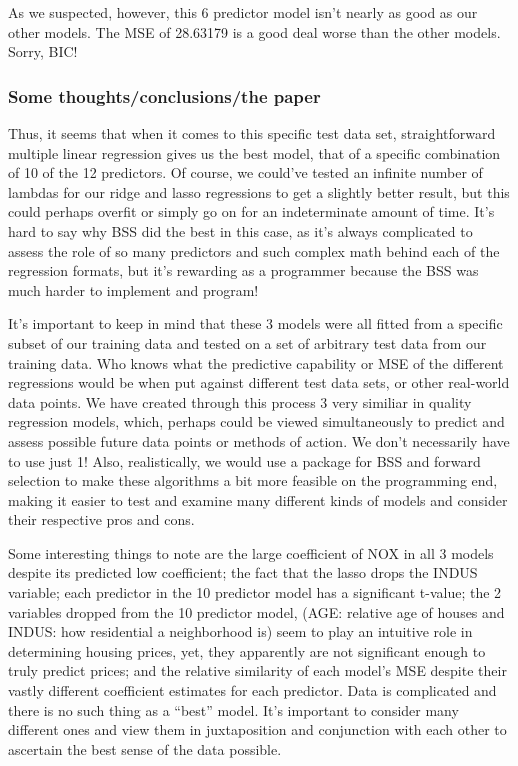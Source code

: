 \documentclass[]{article}
\begin{document}
As we suspected, however, this 6 predictor model isn't nearly as good as
our other models. The MSE of 28.63179 is a good deal worse than the
other models. Sorry, BIC!

\subsubsection{Some thoughts/conclusions/the
paper}\label{some-thoughtsconclusionsthe-paper}

Thus, it seems that when it comes to this specific test data set,
straightforward multiple linear regression gives us the best model, that
of a specific combination of 10 of the 12 predictors. Of course, we
could've tested an infinite number of lambdas for our ridge and lasso
regressions to get a slightly better result, but this could perhaps
overfit or simply go on for an indeterminate amount of time. It's hard
to say why BSS did the best in this case, as it's always complicated to
assess the role of so many predictors and such complex math behind each
of the regression formats, but it's rewarding as a programmer because
the BSS was much harder to implement and program!

It's important to keep in mind that these 3 models were all fitted from
a specific subset of our training data and tested on a set of arbitrary
test data from our training data. Who knows what the predictive
capability or MSE of the different regressions would be when put against
different test data sets, or other real-world data points. We have
created through this process 3 very similiar in quality regression
models, which, perhaps could be viewed simultaneously to predict and
assess possible future data points or methods of action. We don't
necessarily have to use just 1! Also, realistically, we would use a
package for BSS and forward selection to make these algorithms a bit
more feasible on the programming end, making it easier to test and
examine many different kinds of models and consider their respective
pros and cons.

Some interesting things to note are the large coefficient of NOX in all
3 models despite its predicted low coefficient; the fact that the lasso
drops the INDUS variable; each predictor in the 10 predictor model has a
significant t-value; the 2 variables dropped from the 10 predictor
model, (AGE: relative age of houses and INDUS: how residential a
neighborhood is) seem to play an intuitive role in determining housing
prices, yet, they apparently are not significant enough to truly predict
prices; and the relative similarity of each model's MSE despite their
vastly different coefficient estimates for each predictor. Data is
complicated and there is no such thing as a ``best'' model. It's
important to consider many different ones and view them in juxtaposition
and conjunction with each other to ascertain the best sense of the data
possible.
\end{document}
